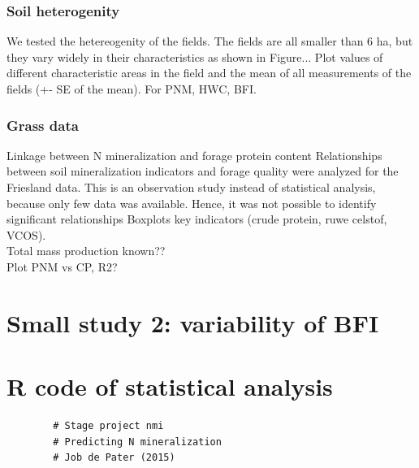 \documentclass[10pt,twoside,dutch,english]{report}
\begin{document}
\begin{appendices}
			\subsection{Soil heterogenity}
			We tested the hetereogenity of the fields. The fields are all smaller than 6 ha, but they vary widely in their characteristics as shown in Figure...
			Plot values of different characteristic areas in the field and the mean of all measurements of the fields (+- SE of the mean). For PNM, HWC, BFI.
			\subsection{Grass data}
			Linkage between N mineralization and forage protein content
	Relationships between soil mineralization indicators and forage quality were analyzed for the Friesland data.  This is an observation study instead of statistical analysis, because only few data was available. Hence, it was not possible to identify significant relationships
	Boxplots key indicators (crude protein, ruwe celstof, VCOS).\\
	Total mass production known??\\
	Plot PNM vs CP, R2?

\chapter{Small study 2: variability of BFI}
		\label{chap:study2}
		
		
		\chapter{R code of statistical analysis} %
		\begin{verbatim}
		# Stage project nmi
		# Predicting N mineralization
		# Job de Pater (2015)
		
		
		\end{verbatim}
		
\end{appendices}



    
\end{document}
